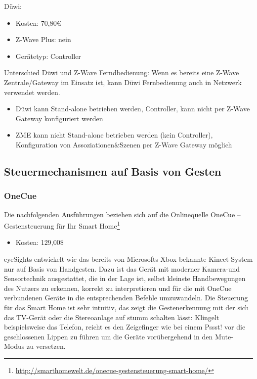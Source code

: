 \noindent
Düwi: 

\begin{itemize}
\item Kosten: 70,80€
\item Z-Wave Plus: nein 
\item Gerätetyp: Controller
\end{itemize}

\noindent
Unterschied Düwi und Z-Wave Ferndbedienung: 
Wenn es bereits eine Z-Wave Zentrale/Gateway im Einsatz ist, kann Düwi Fernbedienung auch in
Netzwerk verwendet werden.

\begin{itemize}
\item Düwi kann Stand-alone betrieben werden, Controller, kann nicht per Z-Wave Gateway konfiguriert werden
\item ZME kann nicht Stand-alone betrieben werden (kein Controller), Konfiguration von Assoziationen\&Szenen per Z-Wave Gateway möglich
\end{itemize}

\subsection{Steuermechanismen auf Basis von Gesten}

\subsubsection{OneCue}

Die nachfolgenden Ausführungen beziehen sich auf die Onlinequelle \glqq OneCue – Gestensteuerung für Ihr Smart Home\grqq\footnote{\url{http://smarthomewelt.de/onecue-gestensteuerung-smart-home/}}

\begin{itemize}
\item Kosten: 129,00\$
\end{itemize}

\noindent
eyeSights entwickelt wie das bereits von Microsofts Xbox bekannte Kinect-System nur auf Basis von Handgesten. Dazu ist das Gerät mit moderner Kamera-und Sensortechnik ausgestattet, die in der Lage ist, selbst kleinste Handbewegungen des Nutzers zu erkennen, korrekt zu interpretieren und für die mit OneCue verbundenen Geräte in die entsprechenden Befehle umzuwandeln. Die Steuerung für das Smart Home ist sehr intuitiv, das zeigt die Gestenerkennung mit der sich das TV-Gerät oder die Stereoanlage auf stumm schalten lässt: Klingelt beispielsweise das Telefon, reicht es den Zeigefinger wie bei einem \glqq Pssst!\grqq{} vor die geschlossenen Lippen zu führen um die Geräte vorübergehend in den Mute-Modus zu versetzen.

